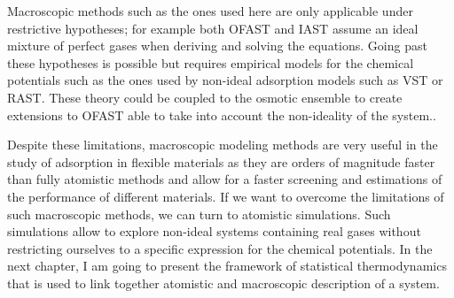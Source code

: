 \documentclass[thesis]{subfiles}
\begin{document}
Macroscopic methods such as the ones used here are only applicable under
restrictive hypotheses; for example both OFAST and IAST assume an ideal mixture
of perfect gases when deriving and solving the equations. Going past these
hypotheses is possible but requires empirical models for the chemical potentials
such as the ones used by non-ideal adsorption models such as VST or RAST. These
theory could be coupled to the osmotic ensemble to create extensions to OFAST
able to take into account the non-ideality of the system..

Despite these limitations, macroscopic modeling methods are very useful in the
study of adsorption in flexible materials as they are orders of magnitude faster
than fully atomistic methods and allow for a faster screening and estimations of
the performance of different materials. If we want to overcome the limitations
of such macroscopic methods, we can turn to atomistic simulations. Such
simulations allow to explore non-ideal systems containing real gases without
restricting ourselves to a specific expression for the chemical potentials. In
the next chapter, I am going to present the framework of statistical
thermodynamics that is used to link together atomistic and macroscopic
description of a system.

\OnlyInSubfile{\printbibliography}
\end{document}
